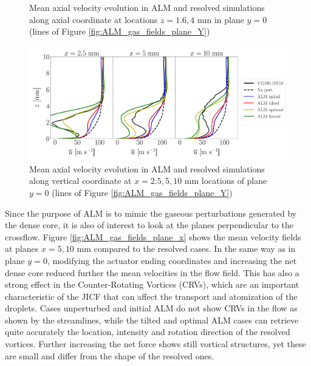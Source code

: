 \begin{figure}[ht]
\begin{subfigure}[b]{0.45\textwidth}
\end{subfigure}
\vspace*{-0.15in}
\caption{Mean axial velocity evolution in ALM and resolved simulations along axial coordinate at locations $z = 1.6, 4$ mm in plane $y = 0$ (lines of Figure \ref{fig:ALM_gas_fields_plane_Y})}
\label{fig:JICF_ICS_ALM_lines_y0_along_x_ux_mean}
\end{figure}

\clearpage



\begin{figure}[ht]
\centering
   \includegraphics[scale=0.26]{./part2_developments/figures_ch6_lagrangian_JICF/gas_field_initial_conditions/ALM_lines_y0_along_z_ux_mean}
\caption{Mean axial velocity evolution in ALM and resolved simulations along vertical coordinate at $x = 2.5, 5, 10$ mm locations of plane $y = 0$ (lines of Figure \ref{fig:ALM_gas_fields_plane_Y})}
\label{fig:JICF_ICS_ALM_lines_y0_along_z_ux_mean}
\end{figure}


Since the purpose of ALM is to mimic the gaseous perturbations generated by the dense core, it is also of interest to look at the planes perpendicular to the crossflow. Figure \ref{fig:ALM_gas_fields_plane_x} shows the mean velocity fields at planes $x = 5, 10$ mm compared to the resolved cases. In the same way as in plane $y = 0$, modifying the actuator ending coordinates and increasing the net dense core reduced further the mean velocities in the flow field. This has also a strong effect in the Counter-Rotating Vortices (CRVs), which are an important characteristic of the JICF that can affect the transport and atomization of the droplets. Cases unperturbed and initial ALM do not show CRVs in the flow as shown by the streamlines, while the tilted and optimal ALM cases can retrieve quite accurately the location,  intensity and rotation direction of the resolved vortices. Further increasing the net force shows still vortical structures, yet these are small and differ from the shape of the resolved ones. %




